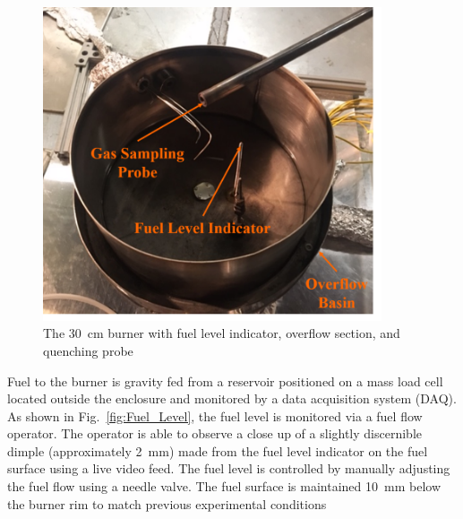 \documentclass[12pt]{article}
\begin{document}
\begin{figure}[h!]
	\centering
\includegraphics[width=10.0cm,keepaspectratio]{Pool_Burner.png}
	\caption[Photograph of the burner]{The 30~cm burner with fuel level indicator, overflow section, and quenching probe}
	\label{fig:Pool Burner}
\end{figure}

Fuel to the burner is gravity fed from a reservoir positioned on a mass load cell located outside the enclosure and monitored by a data acquisition system (DAQ). As shown in Fig.~\ref{fig:Fuel_Level}, the fuel level is monitored via a fuel flow operator. The operator is able to observe a close up of a slightly discernible dimple (approximately \SI{2}{mm}) made from the fuel level indicator on the fuel surface using a live video feed. The fuel level is controlled by manually adjusting the fuel flow using a needle valve. The fuel surface is maintained \SI{10}{mm} below the burner rim to match previous experimental conditions \cite{Fisher1987,Hamins2016,Kim2019,Weckman1996}
\end{document}
